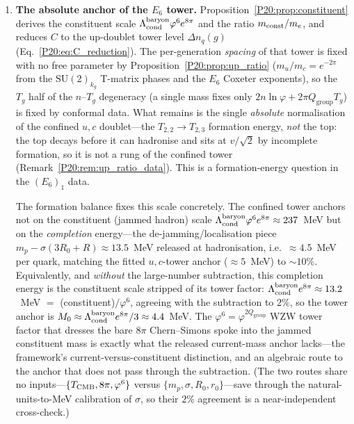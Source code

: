 \documentclass[11pt,a4paper]{article}
\theoremstyle{definition}\newtheorem{definition}[theorem]{Definition}
\theoremstyle{remark}
\newcommand{\vp}{\varphi}
\newcommand{\Lcond}{\Lambda_{\mathrm{cond}}}
\newcommand{\SU}{\mathrm{SU}}
\newcommand{\Qgr}{Q_{\mathrm{group}}}
\begin{document}
\begin{enumerate}[leftmargin=2em,label=\textbf{O\arabic*.}]

\item \textbf{The absolute anchor of the $E_6$ tower.}
Proposition~\ref{P20:prop:constituent} derives the constituent scale
$\Lcond^{\rm baryon}\vp^6 e^{8\pi}$ and the ratio $m_{\rm const}/m_e$,
and reduces $C$ to the up-doublet tower level $\Delta n_q(g)$
(Eq.~\eqref{P20:eq:C_reduction}). The per-generation \emph{spacing} of that
tower is fixed with no free parameter by Proposition~\ref{P20:prop:up_ratio}
($m_u/m_c=e^{-2\pi}$ from the $\SU(2)_{k_g}$ T-matrix phases and the $E_6$
Coxeter exponents), so the $T_g$ half of the $n$--$T_g$ degeneracy (a single
mass fixes only $2n\ln\vp+2\pi\Qgr T_g$) is fixed by conformal data. What
remains is the single \emph{absolute} normalisation of the confined $u,c$
doublet---the $T_{2,2}\!\to\!T_{2,3}$ formation energy, \emph{not} the top:
the top decays before it can hadronise and sits at $v/\sqrt2$ by incomplete
formation, so it is not a rung of the confined tower
(Remark~\ref{P20:rem:up_ratio_data}). This is a formation-energy question in
the $(E_6)_1$ data.

The formation balance fixes this scale concretely. The confined tower anchors
not on the constituent (jammed hadron) scale $\Lcond^{\rm baryon}\vp^6 e^{8\pi}
\approx237$~MeV but on the \emph{completion} energy---the de-jamming/localisation
piece $m_p-\sigma(3R_0+R)\approx13.5$~MeV released at hadronisation, i.e.\
$\approx4.5$~MeV per quark, matching the fitted $u,c$-tower anchor ($\approx5$~MeV)
to $\sim10\%$. Equivalently, and \emph{without} the large-number subtraction, this
completion energy is the constituent scale stripped of its tower factor:
$\Lcond^{\rm baryon}e^{8\pi}\approx13.2$~MeV $=$ (constituent)$/\vp^{6}$, agreeing
with the subtraction to $2\%$, so the tower anchor is
$M_0\approx\Lcond^{\rm baryon}e^{8\pi}/3\approx4.4$~MeV. The
$\vp^{6}=\vp^{2\Qgr}$ WZW tower factor that dresses the bare $8\pi$ Chern--Simons
spoke into the jammed constituent mass is exactly what the released current-mass
anchor lacks---the framework's current-versus-constituent distinction, and an
algebraic route to the anchor that does not pass through the subtraction. (The
two routes share no inputs---$\{T_{\rm CMB},8\pi,\vp^{6}\}$ versus
$\{m_p,\sigma,R_0,r_0\}$---save through the natural-units-to-MeV calibration of
$\sigma$, so their $2\%$ agreement is a near-independent cross-check.)


\end{enumerate}
\end{document}
